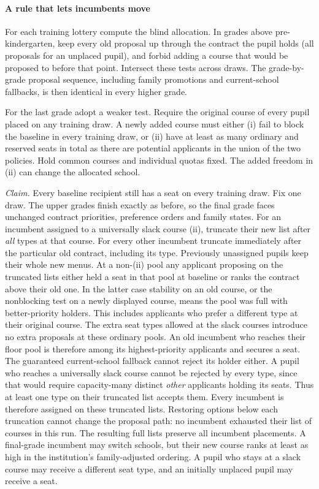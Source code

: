 \paragraph{A rule that lets incumbents move}
For each training lottery compute the blind allocation. In grades above pre-kindergarten, keep every old proposal up through the contract the pupil holds (all proposals for an unplaced pupil), and forbid adding a course that would be proposed to before that point. Intersect these tests across draws. The grade-by-grade proposal sequence, including family promotions and current-school fallbacks, is then identical in every higher grade.

For the last grade adopt a weaker test. Require the original course of every pupil placed on any training draw. A newly added course must either (i) fail to block the baseline in every training draw, or (ii) have at least as many ordinary and reserved seats in total as there are potential applicants in the union of the two policies. Hold common courses and individual quotas fixed. The added freedom in (ii) can change the allocated school.

\emph{Claim.} Every baseline recipient still has a seat on every training draw.
Fix one draw. The upper grades finish exactly as before, so the final grade faces unchanged contract priorities, preference orders and family states. For an incumbent assigned to a universally slack course (ii), truncate their new list after \emph{all} types at that course. For every other incumbent truncate immediately after the particular old contract, including its type. Previously unassigned pupils keep their whole new menus. At a non-(ii) pool any applicant proposing on the truncated lists either held a seat in that pool at baseline or ranks the contract above their old one. In the latter case stability on an old course, or the nonblocking test on a newly displayed course, means the pool was full with better-priority holders. This includes applicants who prefer a different type at their original course. The extra seat types allowed at the slack courses introduce no extra proposals at these ordinary pools. An old incumbent who reaches their floor pool is therefore among its highest-priority applicants and secures a seat. The guaranteed current-school fallback cannot reject its holder either. A pupil who reaches a universally slack course cannot be rejected by every type, since that would require capacity-many distinct \emph{other} applicants holding its seats. Thus at least one type on their truncated list accepts them. Every incumbent is therefore assigned on these truncated lists. Restoring options below each truncation cannot change the proposal path: no incumbent exhausted their list of courses in this run. The resulting full lists preserve all incumbent placements. A final-grade incumbent may switch schools, but their new course ranks at least as high in the institution's family-adjusted ordering. A pupil who stays at a slack course may receive a different seat type, and an initially unplaced pupil may receive a seat.
